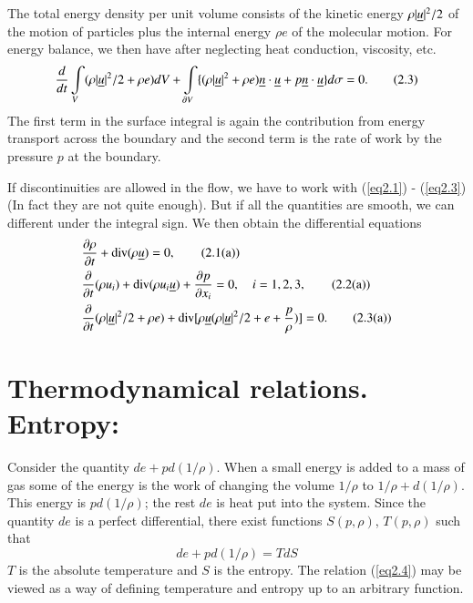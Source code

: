 The total energy density per unit volume consists of the kinetic energy $\rho |\underline{u}|^2 /2$ of the motion of particles plus the internal energy $\rho e$ of the molecular motion. For energy balance, we then have after neglecting heat conduction, viscosity, etc. 
\begin{equation*}
\frac{d}{dt} \int\limits_V (\rho |\underline{u}|^2 / 2 + \rho e) dV + \int\limits_{\partial V} \{(\rho |\underline{u}|^2 + \rho e) \underline{n} \cdot \underline{u} + p \underline{n} \cdot \underline{u} \}  d \sigma = 0. 
\tag{2.3}\label{eq2.3}
\end{equation*}
The first term in the surface integral is again the contribution from energy transport across the  boundary and the second term is the rate of work by the pressure $p$ at the boundary.

If discontinuities are allowed in the flow, we have to work with (\ref{eq2.1}) - (\ref{eq2.3}) (In fact they are not quite enough). But if all the quantities are smooth, we can different under the integral sign. We then obtain the differential equations
\begin{align*}
& \frac{\partial \rho}{\partial t} + \operatorname{div} (\rho \underline{u}) = 0, \tag{2.1(a)}\label{eq2.1a}\\
& \frac{\partial}{\partial t} (\rho u_i) + \operatorname{div} (\rho u_i \underline{u}) + \frac{\partial p}{\partial x_i} = 0,\quad i = 1,2,3, \tag{2.2(a)}\label{eq2.2a}\\
& \frac{\partial}{\partial t} (\rho |\underline{u}|^2 / 2 + \rho e) + \operatorname{div} [\rho \underline{u} (\rho |\underline{u}|^2 / 2 + e + \frac{p}{\rho})] = 0. \tag{2.3(a)}\label{eq2.3a}
\end{align*}\pageoriginale

\section{Thermodynamical relations. Entropy:}\label{chap2:sec2.2}

Consider the quantity $de + pd (1/\rho)$. When a small energy is added to a mass of gas some of the energy is the work of changing the volume $1/\rho$ to $1/\rho + d (1/\rho)$. This energy is $pd(1/\rho)$; the rest $de$ is heat put into the system. Since the quantity $de$ is a perfect differential, there exist functions $S(p,\rho)$, $T(p,\rho)$ such that 
\begin{equation*}
de + pd (1/\rho) = TdS
\tag{2.4}\label{eq2.4}
\end{equation*}
$T$ is the absolute temperature and $S$ is the entropy. The relation (\ref{eq2.4}) may be viewed as a way of defining temperature and entropy up to an arbitrary function.

